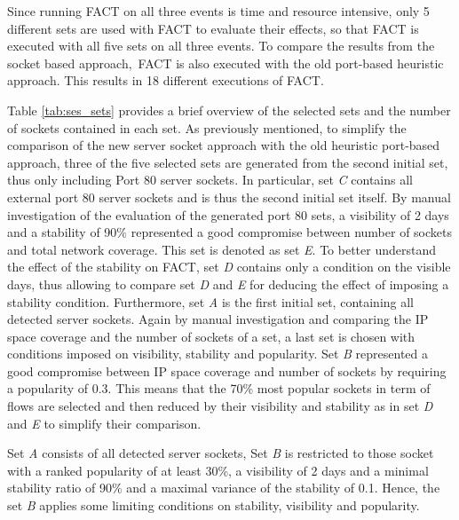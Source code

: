 Since running \gls{FACT} on all three events is time and resource intensive, only 5 different sets are used with \gls{FACT} to evaluate their effects, so that \gls{FACT} is executed with all five sets on all three events. To compare the results from the socket based approach, \gls{FACT} is also executed with the old port-based heuristic approach. This results in 18 different executions of \gls{FACT}.

Table \ref{tab:ses_sets} provides a brief overview of the selected sets and the number of sockets contained in each set. 
As previously mentioned, to simplify the comparison of the new \gls{server socket} approach with the old heuristic port-based approach, three of the five selected sets are generated from the second initial set, thus only including Port 80 \glspl{server socket}. In particular, set \emph{C} contains all external port 80 \glspl{server socket} and is thus the second initial set itself. 
By manual investigation of the evaluation of the generated port 80 sets, a visibility of 2 days and a stability of 90\% represented a good compromise between number of sockets and total network coverage. 
This set is denoted as set \emph{E}. To better understand the effect of the stability on \gls{FACT}, set \emph{D} contains only a condition on the visible days, thus allowing to compare set \emph{D} and \emph{E} for deducing the effect of imposing a stability condition. 
Furthermore, set \emph{A} is the first initial set, containing all detected \glspl{server socket}. Again by manual investigation and comparing the IP space coverage and the number of sockets of a set, a last set is chosen with conditions imposed on visibility, stability and popularity. Set \emph{B} represented a good compromise between IP space coverage and number of sockets by requiring a popularity of 0.3. This means that the 70\% most popular sockets in term of flows are selected and then reduced by their visibility and stability as in set \emph{D} and \emph{E} to simplify their comparison. 

Set \emph{A} consists of all detected \glspl{server socket}, Set \emph{B} is restricted to those socket with a ranked popularity of at least 30\%, a visibility of 2 days and a minimal stability ratio of 90\% and a maximal variance of the stability of 0.1. 
Hence, the set \emph{B} applies some limiting conditions on stability, visibility and popularity. 

